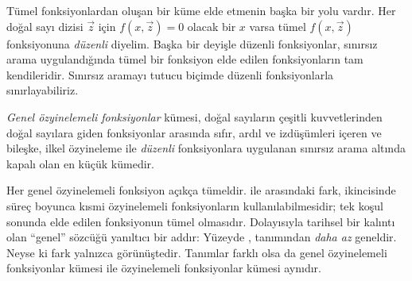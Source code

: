 \documentclass[../../../include/open-logic-section]{subfiles}
\begin{document}

Tümel fonksiyonlardan oluşan bir küme elde etmenin başka bir yolu vardır.
Her doğal sayı dizisi $\vec z$ için $f(x,\vec z)=0$ olacak bir $x$ varsa
tümel $f(x,\vec z)$ fonksiyonuna \emph{düzenli} diyelim. Başka bir deyişle
düzenli fonksiyonlar, sınırsız arama uygulandığında tümel bir fonksiyon elde
edilen fonksiyonların tam kendileridir. Sınırsız aramayı tutucu biçimde
düzenli fonksiyonlarla sınırlayabiliriz.

\begin{defn}
\emph{Genel özyinelemeli fonksiyonlar} kümesi, doğal sayıların çeşitli
kuvvetlerinden doğal sayılara giden fonksiyonlar arasında sıfır, ardıl ve
izdüşümleri içeren ve bileşke, ilkel özyineleme ile \emph{düzenli}
fonksiyonlara uygulanan sınırsız arama altında kapalı olan en küçük kümedir.
\end{defn}

Her genel özyinelemeli fonksiyon açıkça tümeldir.
 ile  arasındaki
fark, ikincisinde süreç boyunca kısmi özyinelemeli fonksiyonların
kullanılabilmesidir; tek koşul sonunda elde edilen fonksiyonun tümel
olmasıdır. Dolayısıyla tarihsel bir kalıntı olan ``genel'' sözcüğü yanıltıcı
bir addır: Yüzeyde ,
 tanımından \emph{daha az} geneldir. Neyse ki
fark yalnızca görünüştedir. Tanımlar farklı olsa da genel özyinelemeli
fonksiyonlar kümesi ile özyinelemeli fonksiyonlar kümesi aynıdır.
\end{document}
